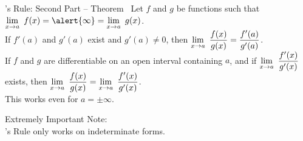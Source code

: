 \begin{frame}[t]%
\begin{block}{\hosp's Rule: Second Part -- Theorem~}
Let $f$ and $g$ be functions such that  $\dlimx{a} f(x)  = \alert{\infty} = \dlimx{a}g(x)$.\\[1em]


If $f'(a)$ and $g'(a)$ exist and $g'(a) \neq 0$, then
\textcolor{M3}{$\displaystyle\lim_{x \to a}~\frac{f(x)}{g(x)} =\frac{f'(a)}{g'(a)}$}.\\[2em]


If $f$ and $g$ are differentiable on an open interval containing $a$, and if $\displaystyle\displaystyle\lim_{x \to a}~ \dfrac{f'(x)}{g'(x)}$ exists, then
\textcolor{C1}{$\displaystyle\lim_{x \to a}~\frac{f(x)}{g(x)} =\displaystyle\lim_{x \to a}~\frac{f'(x)}{g'(x)}$}.\\[1em]

This works even for $a = \pm \infty$.
\end{block}
\vfill

\color{M4} Extremely Important Note:\\ \hosp's Rule only works on indeterminate forms.
\end{frame}

